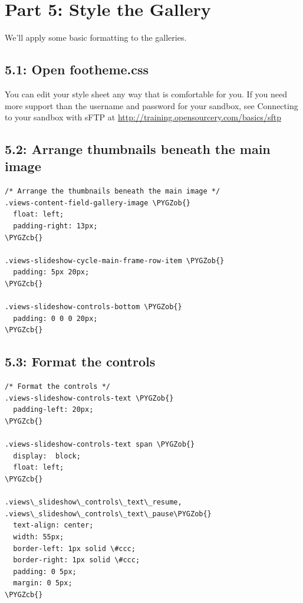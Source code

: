 \documentclass[letterpaper,10pt,english]{sphinxmanual}
\def\PYGZob{\char`\{}
\def\PYGZcb{\char`\}}
\begin{document}
\section{Part 5: Style the Gallery}
\label{slides:part-5-style-the-gallery}
We'll apply some basic formatting to the galleries.


\subsection{5.1: Open footheme.css}
\label{slides:open-footheme-css}
You can edit your style sheet any way that is comfortable for you. If you need more support than the username and password for your sandbox, see Connecting to your sandbox with sFTP at \href{http://training.opensourcery.com/basics/sftp}{http://training.opensourcery.com/basics/sftp}


\subsection{5.2: Arrange thumbnails beneath the main image}
\label{slides:arrange-thumbnails-beneath-the-main-image}
\begin{Verbatim}[commandchars=\\\{\}]
/* Arrange the thumbnails beneath the main image */
.views-content-field-gallery-image \PYGZob{}
  float: left;
  padding-right: 13px;
\PYGZcb{}

.views-slideshow-cycle-main-frame-row-item \PYGZob{}
  padding: 5px 20px;
\PYGZcb{}

.views-slideshow-controls-bottom \PYGZob{}
  padding: 0 0 0 20px;
\PYGZcb{}
\end{Verbatim}


\subsection{5.3: Format the controls}
\label{slides:format-the-controls}
\begin{Verbatim}[commandchars=\\\{\}]
/* Format the controls */
.views-slideshow-controls-text \PYGZob{}
  padding-left: 20px;
\PYGZcb{}

.views-slideshow-controls-text span \PYGZob{}
  display:  block;
  float: left;
\PYGZcb{}

.views\_slideshow\_controls\_text\_resume,
.views\_slideshow\_controls\_text\_pause\PYGZob{}
  text-align: center;
  width: 55px;
  border-left: 1px solid \#ccc;
  border-right: 1px solid \#ccc;
  padding: 0 5px;
  margin: 0 5px;
\PYGZcb{}
\end{Verbatim}
\end{document}
